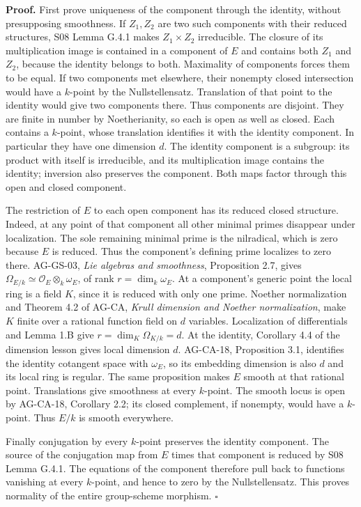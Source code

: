 \documentclass[11pt,a4paper,openany]{report}
\newcounter{none}
\begin{document}
\textbf{Proof.} First prove uniqueness of the component through the identity, without presupposing smoothness. If \(Z_1,Z_2\) are two such components with their reduced structures, S08 Lemma G.4.1 makes \(Z_1\times Z_2\) irreducible. The closure of its multiplication image is contained in a component of \(E\) and contains both \(Z_1\) and \(Z_2\), because the identity belongs to both. Maximality of components forces them to be equal. If two components met elsewhere, their nonempty closed intersection would have a \(k\)-point by the Nullstellensatz. Translation of that point to the identity would give two components there. Thus components are disjoint. They are finite in number by Noetherianity, so each is open as well as closed. Each contains a \(k\)-point, whose translation identifies it with the identity component. In particular they have one dimension \(d\). The identity component is a subgroup: its product with itself is irreducible, and its multiplication image contains the identity; inversion also preserves the component. Both maps factor through this open and closed component.

The restriction of \(E\) to each open component has its reduced closed structure. Indeed, at any point of that component all other minimal primes disappear under localization. The sole remaining minimal prime is the nilradical, which is zero because \(E\) is reduced. Thus the component's defining prime localizes to zero there. AG-GS-03, \emph{Lie algebras and smoothness}, Proposition 2.7, gives \(\Omega_{E/k}\simeq\mathcal O_E\otimes_k\omega_E\), of rank \(r=\dim_k\omega_E\). At a component's generic point the local ring is a field \(K\), since it is reduced with only one prime. Noether normalization and Theorem 4.2 of AG-CA, \emph{Krull dimension and Noether normalization}, make \(K\) finite over a rational function field on \(d\) variables. Localization of differentials and Lemma 1.B give \(r=\dim_K\Omega_{K/k}=d\). At the identity, Corollary 4.4 of the dimension lesson gives local dimension \(d\). AG-CA-18, Proposition 3.1, identifies the identity cotangent space with \(\omega_E\), so its embedding dimension is also \(d\) and its local ring is regular. The same proposition makes \(E\) smooth at that rational point. Translations give smoothness at every \(k\)-point. The smooth locus is open by AG-CA-18, Corollary 2.2; its closed complement, if nonempty, would have a \(k\)-point. Thus \(E/k\) is smooth everywhere.

Finally conjugation by every \(k\)-point preserves the identity component. The source of the conjugation map from \(E\) times that component is reduced by S08 Lemma G.4.1. The equations of the component therefore pull back to functions vanishing at every \(k\)-point, and hence to zero by the Nullstellensatz. This proves normality of the entire group-scheme morphism. \(\square\)
\end{document}
